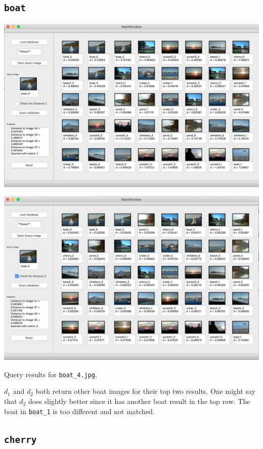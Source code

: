 \documentclass[letterpaper]{article}
\begin{document}
\subsection{\texttt{boat}}
\begin{center}
  \includegraphics[width=\textwidth]{boat_4_distance1.png}
  
  \includegraphics[width=\textwidth]{boat_4_distance2.png}
  
  Query results for \texttt{boat\_4.jpg}.
\end{center}

$d_1$ and $d_2$ both return other boat images for their top two results. One
might say that $d_2$ does slightly better since it has another boat result in
the top row. The boat in \texttt{boat\_1} is too different and not matched.

\subsection{\texttt{cherry}}
\end{document}
